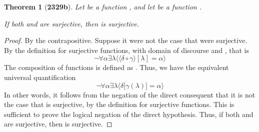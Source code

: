 \documentclass[preview]{standalone}
\newtheorem{theorem}{Theorem}
\begin{document}
\begin{theorem}[\textbf{2329b}]
    Let \bm{$\delta$} be a function 
    , 
    and let \bm{$\gamma$} be a function 
    \bm{$\gamma : \Lambda \rightarrow \Delta$}. 
    \begin{center}
        If both \bm{$\delta$} and \bm{$\gamma$} are surjective, 
        then 
        \bm{$\big \langle \delta \circ \gamma \big \rangle$} 
        is surjective.
    \end{center}
\end{theorem}

\begin{proof}
    By the contrapositive. 
    Suppose it were not the case that
    \bm{$\big \langle \delta \circ \gamma \big \rangle$} 
    were surjective. 
    By the definition for surjective functions,
    with domain of discourse \bm{$\lambda \in \Lambda$} 
    and , 
    that is
    \begin{equation*}
        \lnot \forall \alpha \exists \lambda \Big \langle
            \big \langle \delta \circ \gamma \big \rangle [\lambda] 
                = 
            \alpha
        \Big \rangle
    \end{equation*}
    The composition of functions 
    \bm{$\big \langle \delta \circ \gamma \big \rangle [\lambda]$} 
    is defined as \bm{$\delta \big[ \gamma(\lambda) \big]$}.
    Thus, we have the equivalent universal quantification
    \begin{equation*}
        \lnot \forall \alpha \exists \lambda \Big \langle
            \delta \big[ \gamma (\lambda) \big] = \alpha \Big \rangle
    \end{equation*}
    In other words, it follows from the negation of the direct consequent 
    that it is not the case that \bm{$\delta$} is surjective, 
    by the definition for surjective functions.
    This is sufficient to prove the logical negation of the direct hypothesis.
    Thus, if both \bm{$\delta$} and \bm{$\gamma$} are surjective, 
    then \bm{$\big \langle \delta \circ \gamma \big \rangle$} is surjective.
\end{proof}
\end{document}
